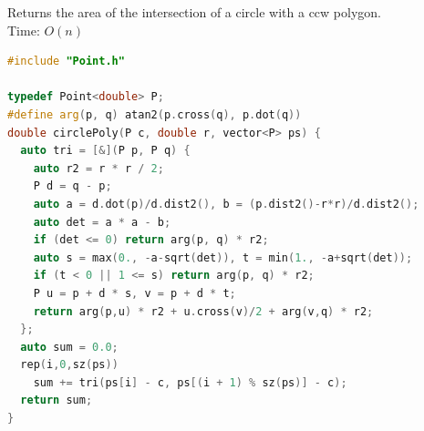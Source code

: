 Returns the area of the intersection of a circle with a ccw polygon. \\
Time: $O(n)$
\begin{lstlisting}[style=codebook, language=C++]
#include "Point.h"

typedef Point<double> P;
#define arg(p, q) atan2(p.cross(q), p.dot(q))
double circlePoly(P c, double r, vector<P> ps) {
  auto tri = [&](P p, P q) {
    auto r2 = r * r / 2;
    P d = q - p;
    auto a = d.dot(p)/d.dist2(), b = (p.dist2()-r*r)/d.dist2();
    auto det = a * a - b;
    if (det <= 0) return arg(p, q) * r2;
    auto s = max(0., -a-sqrt(det)), t = min(1., -a+sqrt(det));
    if (t < 0 || 1 <= s) return arg(p, q) * r2;
    P u = p + d * s, v = p + d * t;
    return arg(p,u) * r2 + u.cross(v)/2 + arg(v,q) * r2;
  };
  auto sum = 0.0;
  rep(i,0,sz(ps))
    sum += tri(ps[i] - c, ps[(i + 1) % sz(ps)] - c);
  return sum;
}
\end{lstlisting}
